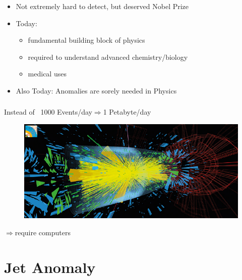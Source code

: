 \documentclass[hyperref={pdfpagelabels=false}]{beamer}
\begin{document}
\begin{frame}[label=]
\begin{itemize}
    \item Not extremely hard to detect, but deserved Nobel Prize

    \item Today:

\begin{itemize}

    \item fundamental building block of physics

    \item required to understand advanced chemistry/biology

    \item medical uses


\end{itemize}
    \item Also Today: Anomalies are sorely needed in Physics


\end{itemize}
\end{frame}




\begin{frame}[label=]
\frametitle{}
Instead of ~1000 Events/day$\Rightarrow$1 Petabyte/day

\begin{figure}[H] 
  \centering
\includegraphics[width=1.0\textwidth]{../imgs/lhc_event2.jpg}
\label{fig:lhc_event2jpg}
  \end{figure}


$\Rightarrow$require computers
\end{frame}




\newpage
\section{Jet Anomaly}\label{sec:Jet Anomaly}
\end{document}
